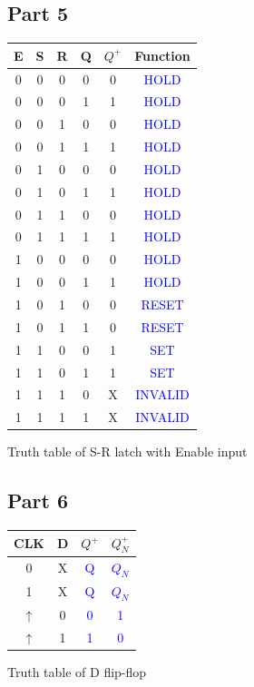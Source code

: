 \documentclass[pdftex,12pt,a4paper]{article}
\theoremstyle{plain}
\begin{document}
\subsection{Part 5}
\begin{center}
\begin{tabular}{c c c c | c c}
E & S & R & Q & $Q^+$ & Function \\
\hline 
0 & 0 & 0 & 0 & 0 & \textcolor{blue}{HOLD}\\
0 & 0 & 0 & 1 & 1 & \textcolor{blue}{HOLD}\\
0 & 0 & 1 & 0 & 0 & \textcolor{blue}{HOLD}\\
0 & 0 & 1 & 1 & 1 & \textcolor{blue}{HOLD}\\
0 & 1 & 0 & 0 & 0 & \textcolor{blue}{HOLD}\\
0 & 1 & 0 & 1 & 1 & \textcolor{blue}{HOLD}\\
0 & 1 & 1 & 0 & 0 & \textcolor{blue}{HOLD}\\
0 & 1 & 1 & 1 & 1 & \textcolor{blue}{HOLD}\\
1 & 0 & 0 & 0 & 0 & \textcolor{blue}{HOLD}\\
1 & 0 & 0 & 1 & 1 & \textcolor{blue}{HOLD}\\
1 & 0 & 1 & 0 & 0 & \textcolor{blue}{RESET}\\
1 & 0 & 1 & 1 & 0 & \textcolor{blue}{RESET}\\
1 & 1 & 0 & 0 & 1 & \textcolor{blue}{SET}\\
1 & 1 & 0 & 1 & 1 & \textcolor{blue}{SET}\\
1 & 1 & 1 & 0 & X & \textcolor{blue}{INVALID}\\
1 & 1 & 1 & 1 & X & \textcolor{blue}{INVALID}\\
\end{tabular}\par\vspace{1em}
 Truth table of S-R latch with Enable input
\end{center}

\subsection{Part 6}
\begin{center}
\begin{tabular}{c c | c c}
CLK & D & $Q^+$ & $Q^+_N$\\
\hline 
0 & X & \textcolor{blue}{Q} & \textcolor{blue}{$Q_N$}\\
1 & X & \textcolor{blue}{Q} & \textcolor{blue}{$Q_N$}\\
$\uparrow$ & 0 & \textcolor{blue}{0} & \textcolor{blue}{1}\\
$\uparrow$ & 1 & \textcolor{blue}{1} & \textcolor{blue}{0}\\
\end{tabular}\par\vspace{1em}
 Truth table of D flip-flop
\end{center}
\end{document}
